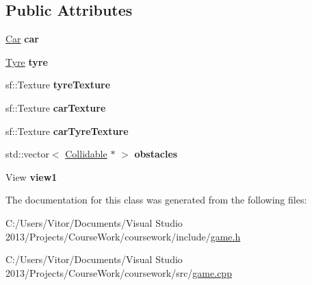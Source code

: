 \subsection*{Public Attributes}
\begin{DoxyCompactItemize}
\item 
\hypertarget{class_game_a6ffa56dab840e2653349ede6ce614140}{}\hyperlink{class_car}{Car} {\bfseries car}\label{class_game_a6ffa56dab840e2653349ede6ce614140}

\item 
\hypertarget{class_game_ab252b56dc27c994d6dc5a8f5638daa85}{}\hyperlink{class_tyre}{Tyre} {\bfseries tyre}\label{class_game_ab252b56dc27c994d6dc5a8f5638daa85}

\item 
\hypertarget{class_game_aaf6429d471b11941257c8d903b68996b}{}sf\+::\+Texture {\bfseries tyre\+Texture}\label{class_game_aaf6429d471b11941257c8d903b68996b}

\item 
\hypertarget{class_game_acdbea4b17782cba40ceaa507efcd6dec}{}sf\+::\+Texture {\bfseries car\+Texture}\label{class_game_acdbea4b17782cba40ceaa507efcd6dec}

\item 
\hypertarget{class_game_a3f2b0a7afbf3a730037b90438153db3d}{}sf\+::\+Texture {\bfseries car\+Tyre\+Texture}\label{class_game_a3f2b0a7afbf3a730037b90438153db3d}

\item 
\hypertarget{class_game_a2d24cc02e4fef7bba277038a2daabf41}{}std\+::vector$<$ \hyperlink{class_collidable}{Collidable} $\ast$ $>$ {\bfseries obstacles}\label{class_game_a2d24cc02e4fef7bba277038a2daabf41}

\item 
\hypertarget{class_game_a423f23c4ffc94a67afd51a6752d8eb58}{}View {\bfseries view1}\label{class_game_a423f23c4ffc94a67afd51a6752d8eb58}

\end{DoxyCompactItemize}


The documentation for this class was generated from the following files\+:\begin{DoxyCompactItemize}
\item 
C\+:/\+Users/\+Vitor/\+Documents/\+Visual Studio 2013/\+Projects/\+Course\+Work/coursework/include/\hyperlink{game_8h}{game.\+h}\item 
C\+:/\+Users/\+Vitor/\+Documents/\+Visual Studio 2013/\+Projects/\+Course\+Work/coursework/src/\hyperlink{game_8cpp}{game.\+cpp}\end{DoxyCompactItemize}
